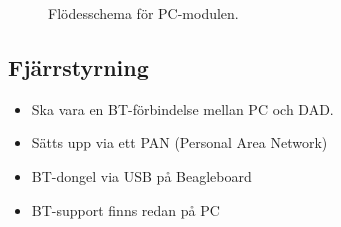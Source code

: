 	\begin{figure}[h]
	\centerline{}
	\caption{Flödesschema för PC-modulen.}
	\end{figure}
	\pagebreak	
	
	\subsection{Fjärrstyrning}
	\begin{itemize}
		\item Ska vara en BT-förbindelse mellan PC och DAD.
		\item Sätts upp via ett PAN (Personal Area Network)
		\item BT-dongel via USB på Beagleboard
		\item BT-support finns redan på PC
	\end{itemize}
%
